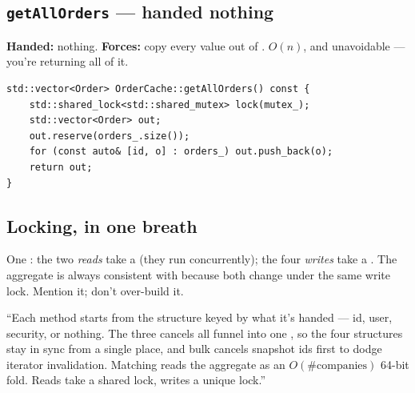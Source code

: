 \subsection{\texttt{getAllOrders} --- handed nothing}

\textbf{Handed:} nothing. \textbf{Forces:} copy every value out of .
$O(n)$, and unavoidable --- you're returning all of it.

\begin{lstlisting}
std::vector<Order> OrderCache::getAllOrders() const {
    std::shared_lock<std::shared_mutex> lock(mutex_);
    std::vector<Order> out;
    out.reserve(orders_.size());
    for (const auto& [id, o] : orders_) out.push_back(o);
    return out;
}
\end{lstlisting}

\subsection{Locking, in one breath}

One : the two \emph{reads} take a 
(they run concurrently); the four \emph{writes} take a . The
aggregate is always consistent with  because both change under the
same write lock. Mention it; don't over-build it.

\begin{say}
``Each method starts from the structure keyed by what it's handed --- id, user,
security, or nothing. The three cancels all funnel into one
, so the four structures stay in sync from a single
place, and bulk cancels snapshot ids first to dodge iterator invalidation.
Matching reads the aggregate as an $O(\#\text{companies})$ 64-bit fold. Reads take
a shared lock, writes a unique lock.''
\end{say}
